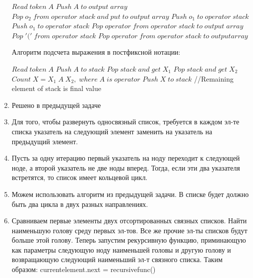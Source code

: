 \documentclass{article}
\begin{document}
\begin{enumerate}
    \begin{algorithmic}
        \State $Read \; token \; A$
          \State $Push \; A \; to \; output \; array$
        \EndIf 
            \State $Pop \; o_{2} \; from \; operator \; stack \; and \; put \; to \; output \; array$
          \EndWhile{}
          \State  $Push \; o_{1} \; to \; operator \; stack$
        \EndIf
          \State  $Push \; o_{1} \; to \; operator \; stack$
        \EndIf
            \State $Pop \; operator \; from \; operator \; stack \; to \; output \; array$
            \State $Pop \; '(' \; from \; operator \; stack $
          \EndWhile
            \State $Pop \; operator \; from  \; operator \; stack \; to \; output array$
          \EndWhile
        \EndIf
      \EndWhile{}
    \end{algorithmic}
    Алгоритм подсчета выражения в постфиксной нотации:
    \begin{algorithmic}
        \State $Read \; token \; A$
          \State $Push \; A \; to \; stack$
        \EndIf
          \State $Pop \; stack \; and \; get \; X_{1}$
          \State $Pop \; stack \; and \; get \; X_{2}$
          \State $Count \; X = X_{1} \; A \; X_{2}, \; where \; A \; is \; operator$
          \State $Push \; X \; to \; stack $
        \EndIf
      \EndWhile
      \State //Remaining element of stack is final value
    \end{algorithmic}
    \item Решено в предыдущей задаче
    \item Для того, чтобы развернуть односвязный список, требуется в каждом эл-те списка указатель на следующий элемент заменить на указатель на предыдущий элемент.
    \item Пусть за одну итерацию первый указатель на ноду переходит к следующей ноде, а второй указатель не две ноды вперед. Тогда, если эти два указателя встретятся, то список имеет кольцевой цикл.
    \item Можем использовать алгоритм из предыдущей задачи. В списке будет должно быть два цикла в двух разных направлениях.
    \item Сравниваем первые элементы двух отсортированных связных списков. 
      Найти наименьшую голову среду первых эл-тов.
      Все же прочие эл-ты списков будут больше этой голову.
      Теперь запустим рекурсивную функцию, приминающую как параметры следующую ноду наименьшей головы и другую голову и возвращающую следующий наименьший эл-т связного списка.
      Таким образом: currentelement.next = recursivefunc()
\end{enumerate}
\end{document}
